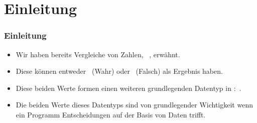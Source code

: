 \documentclass[aspectratio=169,mathserif,notheorems]{beamer}%
\subtitle{10.~Der Datentyp bool}%
\begin{document}
%
%
\startPresentation%
%
\section{Einleitung}%
\begin{frame}%
\frametitle{Einleitung}%
\begin{itemize}%
\item Wir haben bereits Vergleiche von Zahlen, \DEzB~, erwähnt.%
\item<2-> Diese können entweder ~(Wahr) oder ~(Falsch) als Ergebnis haben.%
\item<3-> Diese beiden Werte formen einen weiteren grundlegenden Datentyp in \python:~.%
\item<4-> Die beiden Werte dieses Datentyps sind von grundlegender Wichtigkeit wenn ein Programm Entscheidungen auf der Basis von Daten trifft.%
\end{itemize}%
\end{frame}%
%
\end{document}
